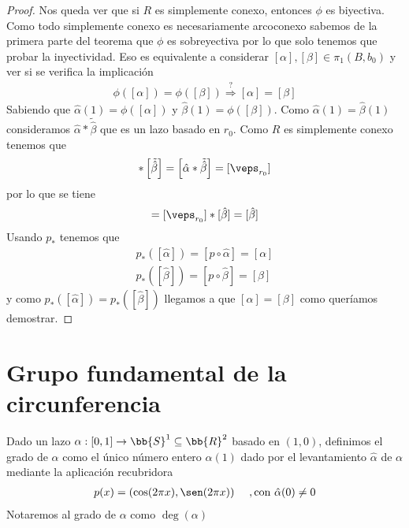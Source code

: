 \begin{teo}
\begin{proof}
        Nos queda ver que si $R$ es simplemente conexo, entonces $\phi$ es biyectiva. Como todo simplemente conexo es necesariamente arcoconexo sabemos de la primera parte del teorema que $\phi$ es sobreyectiva por lo que solo tenemos que probar la inyectividad. Eso es equivalente a considerar $[\alpha],[\beta]\in \pi_1(B,b_0)$ y ver si se verifica la implicación
        \begin{gather*}
             \phi([\alpha]) = \phi([\beta]) \overset{?}{\Rightarrow} [\alpha]=[\beta]
        \end{gather*}
        Sabiendo que $\hat{\alpha}(1) = \phi([\alpha])$ y $\hat{\beta}(1) = \phi([\beta])$. Como $\hat{\alpha}(1)=\hat{\beta}(1)$ consideramos $\hat{\alpha} \ast \tilde{\hat{\beta}}$ que es un lazo basado en $r_0$. Como $R$ es simplemente conexo tenemos que
        \begin{gather*}
            [\hat{\alpha}] \ast \left[\tilde{\hat{\beta}}\right] = \left[\hat{\alpha} \ast \tilde{\hat{\beta}}\right] = [\veps_{r_0}]
        \end{gather*}
        por lo que se tiene 
        \begin{gather*}
            [\hat{\alpha}] = [\veps_{r_0}] \ast [\hat{\beta}] = [\hat{\beta}]
        \end{gather*}
        Usando $p_*$ tenemos que
        \begin{gather*}
            p_*([\hat{\alpha}]) = [p\circ \hat{\alpha}] = [\alpha]\\
            p_*([\hat{\beta}]) = [p\circ \hat{\beta}] = [\beta]
        \end{gather*}
        y como $p_*([\hat{\alpha}]) = p_*([\hat{\beta}])$ llegamos a que $[\alpha] = [\beta]$ como queríamos demostrar.
    \end{proof}
\end{teo}

\section{Grupo fundamental de la circunferencia}

\begin{definicion}
    Dado un lazo $\alpha:[0,1]\to \bb{S}^1 \subseteq \bb{R}^2$ basado en $(1,0)$, definimos el grado de $\alpha$ como el único número entero $\hat{\alpha}(1)$ dado por el levantamiento $\hat{\alpha}$ de $\alpha$ mediante la aplicación recubridora
    \begin{gather*}
        p(x) = (\cos(2\pi x), \sen(2\pi x))\ \ \ \ , \text{con }\hat{\alpha}(0) \neq 0
    \end{gather*}
    Notaremos al grado de $\alpha$ como $\deg(\alpha)$
\end{definicion}

